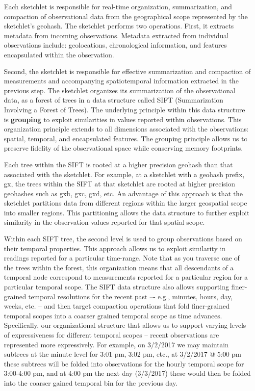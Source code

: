 Each sketchlet is responsible for real-time organization, summarization, and compaction of observational data from the geographical scope represented by the sketchlet’s geohash.  The sketchlet performs two operations. First, it extracts metadata from incoming observations. Metadata extracted from individual observations include: geolocations, chronological information, and features encapsulated within the observation.

Second, the sketchlet is responsible for effective summarization and compaction of measurements and accompanying spatiotemporal information extracted in the previous step. The sketchlet organizes its summarization of the observational data, as a forest of trees in a data structure called SIFT (Summarization Involving a Forest of Trees). The underlying principle within this data structure is \textbf{grouping} to exploit similarities in values reported within observations. This organization principle extends to all dimensions associated with the observations: spatial, temporal, and encapsulated features. The grouping principle allows us to preserve fidelity of the observational space while conserving memory footprints.

Each tree within the SIFT is rooted at a higher precision geohash than that associated with the sketchlet. For example, at a sketchlet with a geohash prefix, gx, the trees within the SIFT at that sketchlet are rooted at higher precision geohashes such as gxb, gxc, gxd, etc. An advantage of this approach is that the sketchlet partitions data from different regions within the larger geospatial scope into smaller regions. This partitioning allows the data structure to further exploit similarity in the observation values reported for that spatial scope. 

Within each SIFT tree, the second level is used to group observations based on their temporal properties. This approach allows us to exploit similarity in readings reported for a particular time-range. Note that as you traverse one of the trees within the forest, this organization means that all descendants of a temporal node correspond to measurements reported for a particular region for a particular temporal scope. The SIFT data structure also allows supporting finer-grained temporal resolutions for the recent past –- e.g., minutes, hours, day, weeks, etc. – and then target compaction operations that fold finer-grained temporal scopes into a coarser grained temporal scope as time advances. Specifically, our organizational structure that allows us to support varying levels of expressiveness for different temporal scopes – recent observations are represented more expressively. For example, on 3/2/2017 we may maintain subtrees at the minute level for 3:01 pm, 3:02 pm, etc., at 3/2/2017 @ 5:00 pm these subtrees will be folded into observations for the hourly temporal scope for 3:00-4:00 pm, and at 4:00 pm the next day (3/3/2017) these would then be folded into the coarser gained temporal bin for the previous day. 

